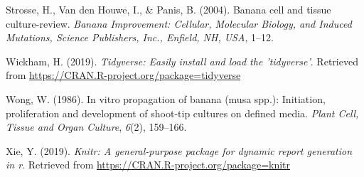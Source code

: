 \documentclass[
  man]{apa6}
\begin{document}
\leavevmode\hypertarget{ref-strosse2004banana}{}%
Strosse, H., Van den Houwe, I., \& Panis, B. (2004). Banana cell and tissue culture-review. \emph{Banana Improvement: Cellular, Molecular Biology, and Induced Mutations, Science Publishers, Inc., Enfield, NH, USA}, 1--12.

\leavevmode\hypertarget{ref-R-tidyverse}{}%
Wickham, H. (2019). \emph{Tidyverse: Easily install and load the 'tidyverse'}. Retrieved from \url{https://CRAN.R-project.org/package=tidyverse}

\leavevmode\hypertarget{ref-wong1986vitro}{}%
Wong, W. (1986). In vitro propagation of banana (musa spp.): Initiation, proliferation and development of shoot-tip cultures on defined media. \emph{Plant Cell, Tissue and Organ Culture}, \emph{6}(2), 159--166.

\leavevmode\hypertarget{ref-R-knitr}{}%
Xie, Y. (2019). \emph{Knitr: A general-purpose package for dynamic report generation in r}. Retrieved from \url{https://CRAN.R-project.org/package=knitr}

\endgroup
\end{document}
